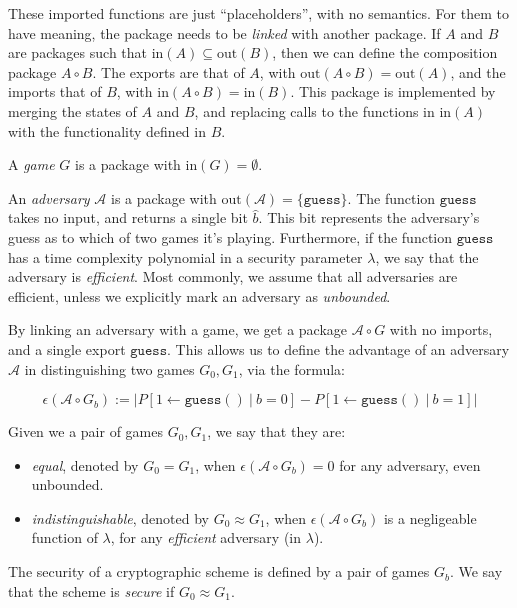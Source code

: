 These imported functions are just ``placeholders'', with no semantics.
For them to have meaning, the package needs to be \emph{linked} with another package.
If $A$ and $B$ are packages such that $\text{in}(A) \subseteq \text{out}(B)$,
then we can define the composition package $A \circ B$.
The exports are that of $A$, with $\text{out}(A \circ B) = \text{out}(A)$,
and the imports that of $B$, with $\text{in}(A \circ B) = \text{in}(B)$.
This package is implemented by merging the states of $A$ and $B$, and replacing
calls to the functions in $\text{in}(A)$ with the functionality defined in $B$.

A \emph{game} $G$ is a package with
$\text{in}(G) = \emptyset$.

An \emph{adversary} $\mathcal{A}$ is a package with $\text{out}(\mathcal{A}) = \{\texttt{guess}\}$.
The function $\texttt{guess}$ takes no input, and returns a single bit $\hat{b}$.
This bit represents the adversary's guess as to which of two games it's playing.
Furthermore, if the function $\texttt{guess}$ has a time complexity polynomial
in a security parameter $\lambda$, we say that the adversary is \emph{efficient}.
Most commonly, we assume that all adversaries are efficient, unless we explicitly
mark an adversary as \emph{unbounded}.

By linking an adversary with a game, we get a package $\mathcal{A} \circ G$
with no imports, and a single export $\texttt{guess}$.
This allows us to define the advantage of an adversary $\mathcal{A}$
in distinguishing two games $G_0, G_1$, via the formula:

$$
\epsilon(\mathcal{A} \circ G_b) := \left|P[1 \gets \texttt{guess}()\ |\ b = 0] - P[1 \gets \texttt{guess}() \ |\ b = 1]\right|
$$

Given we a pair of games $G_0, G_1$, we say that they are:

\begin{itemize}
    \item \emph{equal}, denoted by $G_0 = G_1$, when $\epsilon(\mathcal{A} \circ G_b) = 0$ for any adversary, even unbounded.
    \item \emph{indistinguishable}, denoted by $G_0 \approx G_1$, when $\epsilon(\mathcal{A} \circ G_b)$ is a negligeable function of $\lambda$, for any \emph{efficient} adversary (in $\lambda$).
\end{itemize}

The security of a cryptographic scheme is defined by a pair of games $G_b$.
We say that the scheme is \emph{secure} if $G_0 \approx G_1$.

